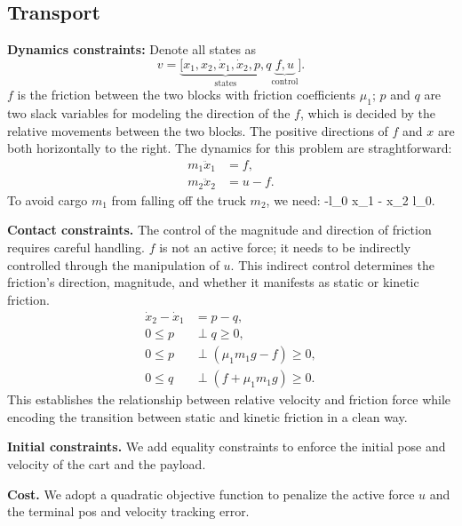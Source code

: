 \subsection{Transport}\label{app:formulation-transport}
\textbf{Dynamics constraints:}
Denote all states as $$v = \underbrace{[x_1, x_2, \dot{x}_1, \dot{x}_2, p, q}_{\text{states}} \underbrace{f,u}_{\text{control}}].$$
$f$ is the friction between the two blocks with friction coefficients $\mu_1$; $p$ and $q$ are two slack variables for modeling the direction of the $f$, which is decided by the relative movements between the two blocks. The positive directions of $f$ and $x$ are both horizontally to the right. The dynamics for this problem are straghtforward:
\begin{align}
    m_1\ddot{x}_1 &= f,\\
    m_2\ddot{x}_2 &= u-f.
\end{align}
To avoid cargo $m_1$ from falling off the truck $m_2$, we need:
\beq -l_0 \leq x_1 - x_2 \leq l_0.\eeq

\textbf{Contact constraints.}
The control of the magnitude and direction of friction requires careful handling. $f$ is not an active force; it needs to be indirectly controlled through the manipulation of $u$. This indirect control determines the friction's direction, magnitude, and whether it manifests as static or kinetic friction.
\begin{align}
    \dot{x}_2 - \dot{x}_1 &= p - q,\\
    0\leq p &\perp q \geq 0,\\
    0\leq p &\perp (\mu_1 m_1g -f) \geq 0,\\
    0\leq q &\perp (f+ \mu_1m_1g) \geq 0.
\end{align}
This establishes the relationship between relative velocity and friction force while encoding the transition between static and kinetic friction in a clean way.

\textbf{Initial constraints.}
We add equality constraints to enforce the initial pose and velocity of the cart and the payload.

\textbf{Cost.}
We adopt a quadratic objective function to penalize the active force $u$ and the terminal pos and velocity tracking error.

